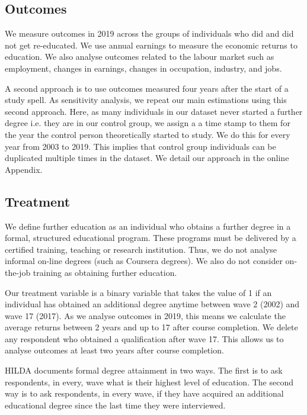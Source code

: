 \documentclass[12pt, a4paper]{article}
\begin{document}
\subsection{Outcomes}

We measure outcomes in 2019 across the groups of individuals who did and did not get re-educated. We use annual earnings to measure the economic returns to education. We also analyse  outcomes related to the labour market such as employment, changes in earnings, changes in occupation, industry, and jobs.

A second approach is to use outcomes measured four years after the start of a study spell. As sensitivity analysis, we repeat our main estimations using this second approach. Here, as many individuals in our dataset never started a further degree i.e. they are in our control group, we assign a a time stamp to them for the year the control person theoretically started to study. We do this for every year from 2003 to 2019. This implies that control group individuals can be duplicated multiple times in the dataset. We detail our approach in the online Appendix. 



\subsection{Treatment}

We define further education as an individual who obtains a further degree in a formal, structured educational program. These programs must be delivered by a certified training, teaching or research institution. Thus, we do not analyse informal on-line degrees (such as Coursera degrees). We also do not consider on-the-job training as obtaining further education.

Our treatment variable is a binary variable that takes the value of 1 if an individual has obtained an additional degree anytime between wave 2 (2002) and wave 17 (2017). As we analyse outcomes in 2019, this means we calculate the average returns between 2 years and up to 17 after course completion. We delete any respondent who obtained a qualification after wave 17. This allows us to analyse outcomes at least two years after course completion.


HILDA documents formal degree attainment in two ways. The first is to ask respondents, in every, wave what is their highest level of education. The second way is to ask respondents, in every wave, if they have acquired an additional educational degree since the last time they were interviewed.
\end{document}
